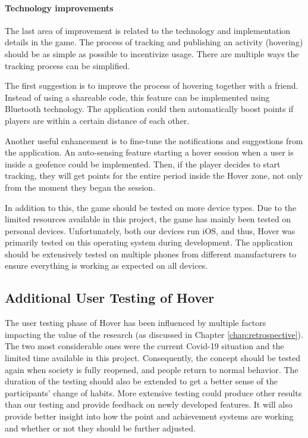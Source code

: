 \paragraph*{Technology improvements}
The last area of improvement is related to the technology and implementation details in the game. The process of tracking and publishing an activity (hovering) should be as simple as possible to incentivize usage. There are multiple ways the tracking process can be simplified.

The first suggestion is to improve the process of hovering together with a friend. Instead of using a shareable code, this feature can be implemented using Bluetooth technology. The application could then automatically boost points if players are within a certain distance of each other.

Another useful enhancement is to fine-tune the notifications and suggestions from the application. An auto-sensing feature starting a hover session when a user is inside a geofence could be implemented. Then, if the player decides to start tracking, they will get points for the entire period inside the Hover zone, not only from the moment they began the session.

In addition to this, the game should be tested on more device types. Due to the limited resources available in this project, the game has mainly been tested on personal devices. Unfortunately, both our devices run iOS, and thus, Hover was primarily tested on this operating system during development. The application should be extensively tested on multiple phones from different manufacturers to ensure everything is working as expected on all devices.

\subsection{Additional User Testing of Hover}
The user testing phase of Hover has been influenced by multiple factors impacting the value of the research (as discussed in Chapter \ref{chap:retrospective}). The two most considerable ones were the current Covid-19 situation and the limited time available in this project. Consequently, the concept should be tested again when society is fully reopened, and people return to normal behavior. The duration of the testing should also be extended to get a better sense of the participants’ change of habits. More extensive testing could produce other results than our testing and provide feedback on newly developed features. It will also provide better insight into how the point and achievement systems are working and whether or not they should be further adjusted.

